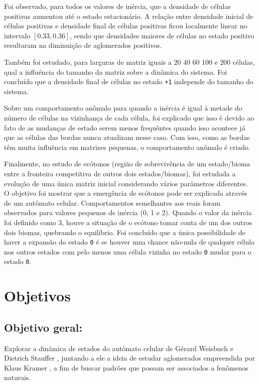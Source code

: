 \documentclass[
	12pt,				%
	openright,			%
	twoside,			%
	a4paper,			%
	english,			%
	french,				%
	spanish,			%
	brazil				%
	]{abntex2}
\begin{document}
Foi observado, para todos os valores de inércia, que a densidade de células positivas aumentou até o estado estacionário. A relação entre densidade inicial de células positivas e densidade final de células positivas ficou localmente linear no intervalo $[0.33, 0.36]$, sendo que densidades maiores de células no estado positivo resultaram na diminuição de aglomerados positivos.

Também foi estudado, para larguras de matriz iguais a $20$ $40$ $60$ $100$ e $200$ células, qual a influência do tamanho da matriz sobre a dinâmica do sistema. Foi concluído que a densidade final de células no estado \texttt{+1} independe do tamanho do sistema.

Sobre um comportamento anômalo para quando a inércia é igual à metade do número de células na vizinhança de cada célula, foi explicado que isso é devido ao fato de as mudanças de estado serem menos frequêntes quando isso acontece já que as células das bordas nunca atualizam nesse caso. Com isso, como as bordas têm muita influência em matrizes pequenas, o comportamento anômalo é criado.

Finalmente, no estudo de ecótonos (região de sobrevivência de um estado/bioma entre a fronteira competitiva de outros dois estados/biomas), foi estudada a evolução de uma única matriz inicial considerando vários parâmetros diferentes. O objetivo foi mostrar que a emergência de ecótonos pode ser explicada através de um autômato celular. Comportamentos semelhantes aos reais foram observados para valores pequenos de inércia (0, 1 e 2). Quando o valor da inércia foi definido como $3$, houve a situação de o ecótono tomar conta de um dos outros dois biomas, quebrando o equilíbrio. Foi concluído que a única possibilidade de haver a expansão do estado \texttt{0} é se houver uma chance não-nula de qualquer célula nos outros estados com pelo menos uma célula vizinha no estado \texttt{0} mudar para o estado \texttt{0}.

\section*{Objetivos}


\subsection*{Objetivo geral:}
Explorar a dinâmica de estados do autômato celular de Gérard Weisbuch e Dietrich Stauffer \cite{stauffer}, juntando a ele a ideia de estudar aglomerados empreendida por Klaus Kramer \cite{klaus}, a fim de buscar padrões que possam ser associados a fenômenos naturais.
\end{document}
